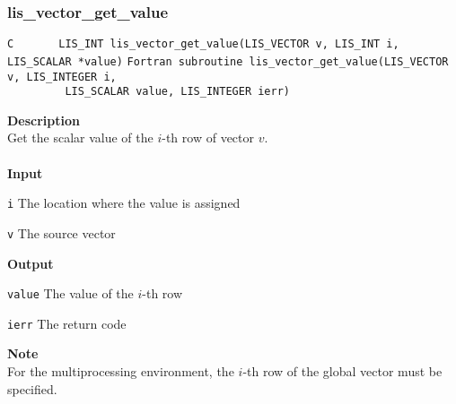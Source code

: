 \documentclass[a4paper]{article}
\newcommand{\namelistlabel}[1]{\mbox{#1}\hfill}
\newenvironment{namelist}[1]{%
\begin{list}{}
  {\let\makelabel\namelistlabel
  \settowidth{\labelwidth}{#1}
  \setlength{\leftmargin}{1.1\labelwidth}}
  }{%
\end{list}}
\begin{document}
\subsubsection{lis\_vector\_get\_value}
\begin{screen}
\verb|C       LIS_INT lis_vector_get_value(LIS_VECTOR v, LIS_INT i, LIS_SCALAR *value)|
\verb|Fortran subroutine lis_vector_get_value(LIS_VECTOR v, LIS_INTEGER i,|\\
\verb|         LIS_SCALAR value, LIS_INTEGER ierr)|
\end{screen}
{\bf Description}\\
\indent
Get the scalar value of the $i$-th row of vector $v$.
\\ \\
\noindent
{\bf Input}
\begin{namelist}{XXXXXXXXXXXXXXXXXXXX}
\item[\tt i] The location where the value is assigned
\item[\tt v] The source vector
\end{namelist}
{\bf Output}
\begin{namelist}{XXXXXXXXXXXXXXXXXXXX}
\item[\tt value] The value of the $i$-th row
\item[\tt ierr] The return code
\end{namelist}
{\bf Note}\\
\indent
For the multiprocessing environment, the $i$-th row of the global vector must be
specified.

\newpage
\end{document}
